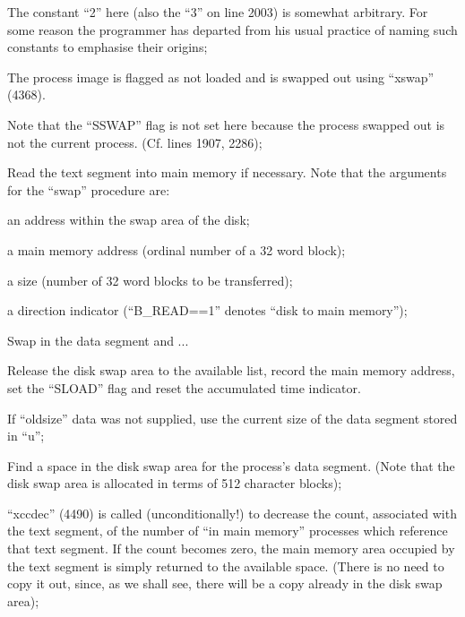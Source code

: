 The constant ``2'' here (also the
``3'' on line 2003) is somewhat
arbitrary. For some reason the
programmer has departed from his
usual practice of naming such
constants to emphasise their origins;

\item[2022:] The process image is flagged as
 not loaded and is swapped out
 using ``xswap'' (4368).

Note that the ``SSWAP'' flag is not
set here because the process
swapped out is not the current
process. (Cf. lines 1907, 2286);

\item[2032:] Read the text segment into main
 memory if necessary. Note that
 the arguments for the ``swap'' procedure are:
	\bi
	\item an address within the swap area of the disk;

	\item a main memory address (ordinal
number of a 32 word block);

	\item a size (number of 32 word blocks
to be transferred);

\item a direction indicator
(``B\_READ==1'' denotes ``disk to
main memory'');
	\ei

\item[2042:] Swap in the data segment and ...

\item[2044:] Release the disk swap area to the
 available list, record the main
 memory address, set the ``SLOAD''
 flag and reset the accumulated
 time indicator.
\ed


\bd
\item[4373:] If ``oldsize'' data was not supplied, use the current size of
the data segment stored in ``u'';

\item[4375:] Find a space in the disk swap
area for the process's data segment. (Note that the disk swap
area is allocated in terms of 512
character blocks);

\item[4378:] ``xccdec'' (4490) is called (unconditionally!) to decrease the
count, associated with the text
segment, of the number of ``in
main memory'' processes which
reference that text segment. If
the count becomes zero, the main
memory area occupied by the text
segment is simply returned to the
available space. (There is no
need to copy it out, since, as we
shall see, there will be a copy
already in the disk swap area);

